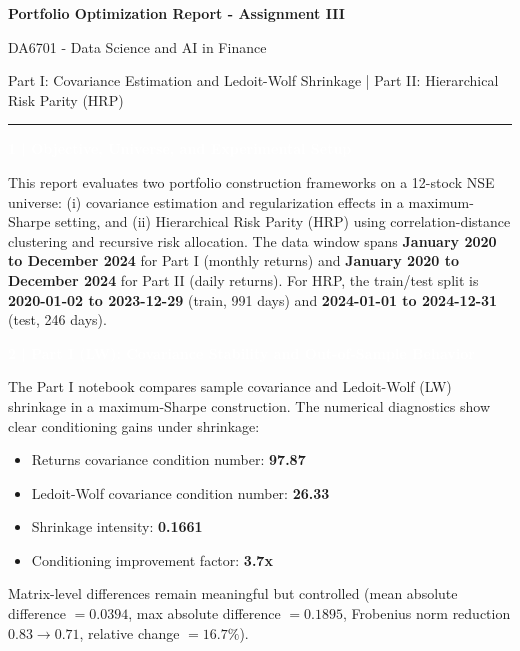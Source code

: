 \documentclass[10pt,a4paper]{article}
\newcommand{\SectionBar}[1]{%
  \vspace{0.35em}
  \noindent\colorbox{ReportBlue}{%
    \parbox{\dimexpr\linewidth-2\fboxsep\relax}{%
      \vspace{2.5pt}\textcolor{white}{\bfseries\footnotesize #1}\vspace{2.5pt}
    }%
  }%
  \vspace{0.35em}
}
\begin{document}
\color{BodyGray}

\begin{center}
  {\fontsize{17}{20}\selectfont\textbf{\textcolor{ReportBlue}{Portfolio Optimization Report - Assignment III}}}\par
  \vspace{3pt}
  {\fontsize{9}{11}\selectfont\textcolor{CaptionGray}{DA6701 - Data Science and AI in Finance}}\par
  \vspace{1pt}
  {\fontsize{9}{11}\selectfont\textcolor{CaptionGray}{Part I: Covariance Estimation and Ledoit-Wolf Shrinkage \quad | \quad Part II: Hierarchical Risk Parity (HRP)}}
\end{center}
\vspace{6pt}
\noindent\textcolor{ReportBlue}{\rule{\linewidth}{2pt}}

\vspace{8pt}
\SectionBar{1 \;|\; Objective, Universe, and Experimental Setup}
{\fontsize{8.1}{10.7}\selectfont\justifying
This report evaluates two portfolio construction frameworks on a 12-stock NSE universe: (i) covariance estimation and regularization effects in a maximum-Sharpe setting, and (ii) Hierarchical Risk Parity (HRP) using correlation-distance clustering and recursive risk allocation. The data window spans \textbf{January 2020 to December 2024} for Part I (monthly returns) and \textbf{January 2020 to December 2024} for Part II (daily returns). For HRP, the train/test split is \textbf{2020-01-02 to 2023-12-29} (train, 991 days) and \textbf{2024-01-01 to 2024-12-31} (test, 246 days).}

\SectionBar{2 \;|\; Part I (LW): Covariance Stability and Out-of-Sample Behavior}
{\fontsize{8.1}{10.7}\selectfont\justifying
The Part I notebook compares sample covariance and Ledoit-Wolf (LW) shrinkage in a maximum-Sharpe construction. The numerical diagnostics show clear conditioning gains under shrinkage:
\begin{itemize}[leftmargin=1.2em,itemsep=0.15em,topsep=0.2em]
  \item Returns covariance condition number: \textbf{97.87}
  \item Ledoit-Wolf covariance condition number: \textbf{26.33}
  \item Shrinkage intensity: \textbf{0.1661}
  \item Conditioning improvement factor: \textbf{3.7x}
\end{itemize}
Matrix-level differences remain meaningful but controlled (mean absolute difference \(= 0.0394\), max absolute difference \(= 0.1895\), Frobenius norm reduction \(0.83 \rightarrow 0.71\), relative change \(= 16.7\%\)).
}
\end{document}
